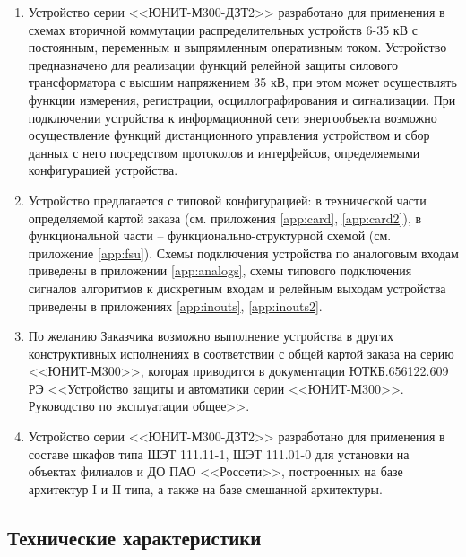 \documentclass[a4paper, 12pt,table, hidelinks, DIV=calc]{extarticle} %
\begin{document}
\color{black}

\begin{enumerate}[label=\arabic{section}.\arabic{subsection}.\arabic*, labelsep=4pt, leftmargin=0pt, itemindent=57pt]

\item
Устройство серии <<ЮНИТ-М300-ДЗТ2>> разработано для применения в схемах вторичной коммутации распределительных устройств 6-35 кВ с постоянным, переменным и выпрямленным оперативным током. Устройство предназначено для реализации функций релейной защиты силового трансформатора с высшим напряжением 35 кВ, при этом может осуществлять функции измерения, регистрации, осциллографирования и сигнализации. При подключении устройства к информационной сети энергообъекта возможно осуществление функций дистанционного управления устройством и сбор данных с него посредством протоколов и интерфейсов, определяемыми конфигурацией устройства.
\item 
Устройство предлагается с типовой конфигурацией: в технической части определяемой картой заказа (см. приложения \ref{app:card}, \ref{app:card2}), в функциональной части -- функционально-структурной схемой (см. приложение \ref{app:fsu}). Схемы подключения устройства по аналоговым входам приведены в приложении \ref{app:analogs}, схемы типового подключения сигналов алгоритмов к дискретным входам и релейным выходам устройства приведены в приложениях \ref{app:inouts}, \ref{app:inouts2}.
\item
По желанию Заказчика возможно выполнение устройства в других конструктивных исполнениях в соответствии с общей картой заказа на серию <<ЮНИТ-М300>>, которая приводится в документации ЮТКБ.656122.609 РЭ <<Устройство защиты и автоматики серии <<ЮНИТ-М300>>. Руководство по эксплуатации общее>>. 
\item
Устройство серии <<ЮНИТ-М300-ДЗТ2>> разработано для применения в составе шкафов типа ШЭТ 111.11-1, ШЭТ 111.01-0 для установки на объектах филиалов и ДО ПАО <<Россети>>, построенных на базе архитектур I и II типа, а также на базе смешанной архитектуры.

\end{enumerate}


\color{uniblue}\subsection{Технические характеристики}
\color{black}
\end{document}

